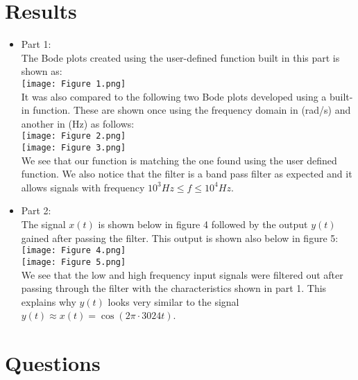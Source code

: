 \documentclass[12pt]{report}
\begin{document}
   
\section{Results}
\begin{itemize}
    \item Part 1:\\
    The Bode plots created using the user-defined function built in this part is shown as:\\
    \texttt{[image: Figure 1.png]}\\
    It was also compared to the following two Bode plots developed using a built-in function. These are shown once using the frequency domain in (rad/s) and another in (Hz) as follows:\\
    \texttt{[image: Figure 2.png]}\\
    \texttt{[image: Figure 3.png]}\\
    We see that our function is matching the one found using the user defined function. We also notice that the filter is a band pass filter as expected and it allows signals with frequency $10^3 Hz\le f \le 10^4 Hz$.
    
    \item Part 2:\\
    The signal $x(t)$ is shown below in figure 4 followed by the output $y(t)$ gained after passing the filter. This output is shown also below in figure 5:\\
    \texttt{[image: Figure 4.png]}\\
    \texttt{[image: Figure 5.png]}\\
    We see that the low and high frequency input signals were filtered out after passing through the filter with the characteristics shown in part 1. This explains why $y(t)$ looks very similar to the signal $y(t)\approx x(t)=\cos(2\pi\cdot3024t)$.
    
\end{itemize}

\section{Questions}
\end{document}
